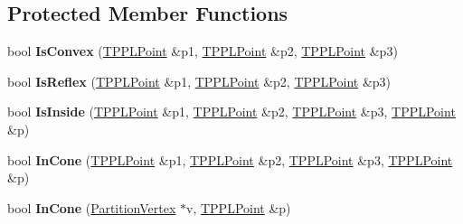 \subsection*{Protected Member Functions}
\begin{DoxyCompactItemize}
\item 
\mbox{\label{class_t_p_p_l_partition_aeef0e8f316953a5515b0e7678830d810}} 
bool {\bfseries Is\+Convex} (\mbox{\hyperlink{struct_t_p_p_l_point}{T\+P\+P\+L\+Point}} \&p1, \mbox{\hyperlink{struct_t_p_p_l_point}{T\+P\+P\+L\+Point}} \&p2, \mbox{\hyperlink{struct_t_p_p_l_point}{T\+P\+P\+L\+Point}} \&p3)
\item 
\mbox{\label{class_t_p_p_l_partition_a3292d28af7b2a747bcb0e402e3e79fd8}} 
bool {\bfseries Is\+Reflex} (\mbox{\hyperlink{struct_t_p_p_l_point}{T\+P\+P\+L\+Point}} \&p1, \mbox{\hyperlink{struct_t_p_p_l_point}{T\+P\+P\+L\+Point}} \&p2, \mbox{\hyperlink{struct_t_p_p_l_point}{T\+P\+P\+L\+Point}} \&p3)
\item 
\mbox{\label{class_t_p_p_l_partition_abb4bb022e2e0cfd99f31f851d000e2ac}} 
bool {\bfseries Is\+Inside} (\mbox{\hyperlink{struct_t_p_p_l_point}{T\+P\+P\+L\+Point}} \&p1, \mbox{\hyperlink{struct_t_p_p_l_point}{T\+P\+P\+L\+Point}} \&p2, \mbox{\hyperlink{struct_t_p_p_l_point}{T\+P\+P\+L\+Point}} \&p3, \mbox{\hyperlink{struct_t_p_p_l_point}{T\+P\+P\+L\+Point}} \&p)
\item 
\mbox{\label{class_t_p_p_l_partition_a4634f52de6a6101ba0a559435db3203c}} 
bool {\bfseries In\+Cone} (\mbox{\hyperlink{struct_t_p_p_l_point}{T\+P\+P\+L\+Point}} \&p1, \mbox{\hyperlink{struct_t_p_p_l_point}{T\+P\+P\+L\+Point}} \&p2, \mbox{\hyperlink{struct_t_p_p_l_point}{T\+P\+P\+L\+Point}} \&p3, \mbox{\hyperlink{struct_t_p_p_l_point}{T\+P\+P\+L\+Point}} \&p)
\item 
\mbox{\label{class_t_p_p_l_partition_ad91aeca729f0825a937d2e896bdb0ec0}} 
bool {\bfseries In\+Cone} (\mbox{\hyperlink{struct_t_p_p_l_partition_1_1_partition_vertex}{Partition\+Vertex}} $\ast$v, \mbox{\hyperlink{struct_t_p_p_l_point}{T\+P\+P\+L\+Point}} \&p)
\item 
\mbox{\label{class_t_p_p_l_partition_a1cb584a13ee5dcf772d0e12c8abae532}} 

\end{DoxyCompactItemize}
